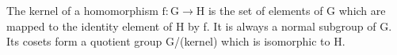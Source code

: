 The kernel of a homomorphism $ \mathrm{f} : \mathrm{G} \to \mathrm{H} $ is
the set of elements of G which are mapped to the identity element of H
by f. It is always a normal subgroup of G. Its cosets form a quotient
group G/(kernel) which is isomorphic to H.